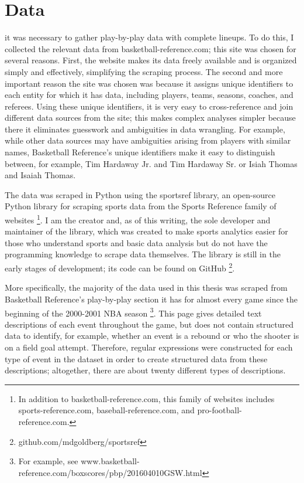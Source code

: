 
\chapter{Data} \label{ch:data} 
\nocite{*}

 it was necessary to gather
play-by-play data with complete lineups. To do this, I collected the relevant data
from basketball-reference.com; this site was chosen for several reasons. First, the
website makes its data freely available and is organized simply and effectively,
simplifying the scraping process. The second and more important reason the site was
chosen was because it assigns unique identifiers to each entity for which it has
data, including players, teams, seasons, coaches, and referees.  Using these unique
identifiers, it is very easy to cross-reference and join different data sources from
the site; this makes complex analyses simpler because there it eliminates guesswork
and ambiguities in data wrangling. For example, while other data sources may have
ambiguities arising from players with similar names, Basketball Reference's unique
identifiers make it easy to distinguish between, for example, Tim Hardaway Jr.
and Tim Hardaway Sr. or Isiah Thomas and Isaiah Thomas.

The data was scraped in Python using the sportsref library, an open-source Python
library for scraping sports data from the Sports Reference family of
websites
\footnote{In addition to basketball-reference.com, this family of websites
includes sports-reference.com, baseball-reference.com, and
pro-football-reference.com.}.
I am the creator and, as of this writing, the sole developer and maintainer of the
library, which was created to make sports analytics easier for those who understand
sports and basic data analysis but do not have the programming knowledge to scrape
data themselves. The library is still in the early stages of development; its
code can be found on GitHub
\footnote{github.com/mdgoldberg/sportsref}.

More specifically, the majority of the data used in this thesis was scraped from
Basketball Reference's play-by-play section it has for almost every game since the
beginning of the 2000-2001 NBA season \footnote{For example, see
www.basketball-reference.com/boxscores/pbp/201604010GSW.html}. This page gives
detailed text descriptions of each event throughout the game, but does not contain
structured data to identify, for example, whether an event is a rebound or who the
shooter is on a field goal attempt. Therefore, regular expressions were constructed
for each type of event in the dataset in order to create structured data from these
descriptions; altogether, there are about twenty different types of descriptions.

